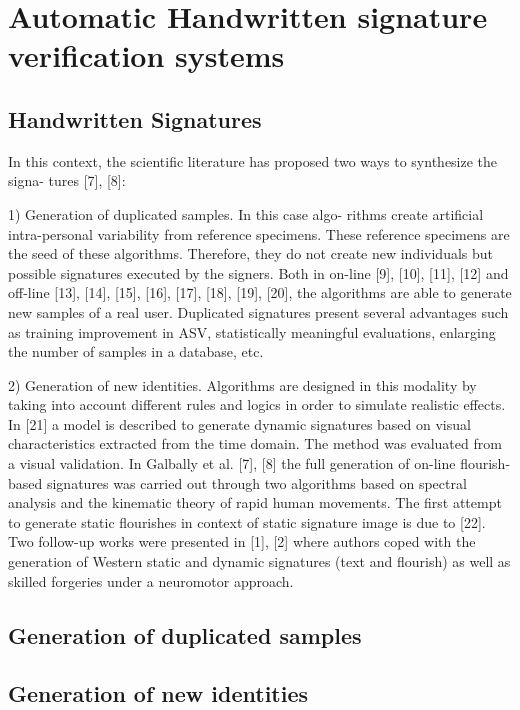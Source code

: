
\chapter{Automatic Handwritten signature verification systems}
\section{Handwritten Signatures}
In this context, the scientific
literature has proposed two ways to synthesize the signa-
tures [7], [8]:

1) Generation of duplicated samples. In this case algo-
rithms create artificial intra-personal variability from reference
specimens. These reference specimens are the seed of these
algorithms. Therefore, they do not create new individuals but
possible signatures executed by the signers. Both in on-line [9],
[10], [11], [12] and off-line [13], [14], [15], [16], [17], [18],
[19], [20], the algorithms are able to generate new samples of
a real user. Duplicated signatures present several advantages
such as training improvement in ASV, statistically meaningful
evaluations, enlarging the number of samples in a database,
etc.

2) Generation of new identities. Algorithms are designed
in this modality by taking into account different rules and
logics in order to simulate realistic effects. In [21] a model
is described to generate dynamic signatures based on visual
characteristics extracted from the time domain. The method
was evaluated from a visual validation. In Galbally et al. [7],
[8] the full generation of on-line flourish-based signatures was
carried out through two algorithms based on spectral analysis
and the kinematic theory of rapid human movements. The
first attempt to generate static flourishes in context of static
signature image is due to [22]. Two follow-up works were
presented in [1], [2] where authors coped with the generation
of Western static and dynamic signatures (text and flourish) as
well as skilled forgeries under a neuromotor approach.

\section{Generation of duplicated samples}

\section{Generation of new identities}
